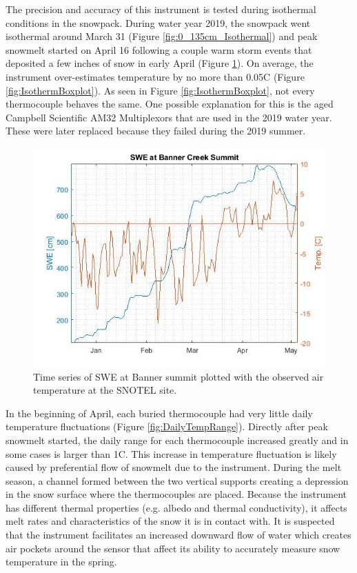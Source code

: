 The precision and accuracy of this instrument is tested during isothermal conditions in the snowpack. During water year 2019, the snowpack went isothermal around March 31 (Figure \ref{fig:0_135cm_Isothermal}) and peak snowmelt started on April 16 following a couple warm storm events that deposited a few inches of snow in early April (Figure \ref{fig:SWE_SNTLTemp}). On average, the instrument over-estimates temperature by no more than 0.05\textdegree C (Figure \ref{fig:IsothermBoxplot}). As seen in Figure \ref{fig:IsothermBoxplot}, not every thermocouple behaves the same. One possible explanation for this is the aged Campbell Scientific AM32 Multiplexors that are used in the 2019 water year. These were later replaced because they failed during the 2019 summer.  
 
\begin{figure}[H]
    \centering
    \includegraphics[width=0.7\linewidth]{figures/SWE_SNTLTemp.jpg}
    \caption{Time series of SWE at Banner summit plotted with the observed air temperature at the SNOTEL site.}
    \label{fig:SWE_SNTLTemp}
\end{figure}

In the beginning of April, each buried thermocouple had very little daily temperature fluctuations (Figure \ref{fig:DailyTempRange}). Directly after peak snowmelt started, the daily range for each thermocouple increased greatly and in some cases is larger than 1\textdegree C. This increase in temperature fluctuation is likely caused by preferential flow of snowmelt due to the instrument. During the melt season, a channel formed between the two vertical supports creating a depression in the snow surface where the thermocouples are placed. Because the instrument has different thermal properties (e.g. albedo and thermal conductivity), it affects melt rates and characteristics of the snow it is in contact with. It is suspected that the instrument facilitates an increased downward flow of water which creates air pockets around the sensor that affect its ability to accurately measure snow temperature in the spring. 

